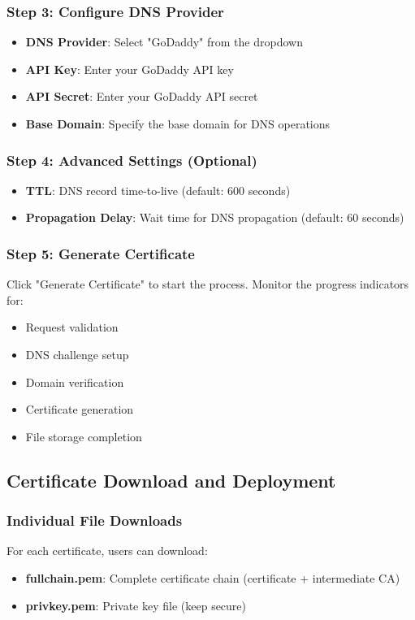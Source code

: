 \subsubsection{Step 3: Configure DNS Provider}
\begin{itemize}
    \item \textbf{DNS Provider}: Select "GoDaddy" from the dropdown
    \item \textbf{API Key}: Enter your GoDaddy API key
    \item \textbf{API Secret}: Enter your GoDaddy API secret
    \item \textbf{Base Domain}: Specify the base domain for DNS operations
\end{itemize}

\subsubsection{Step 4: Advanced Settings (Optional)}
\begin{itemize}
    \item \textbf{TTL}: DNS record time-to-live (default: 600 seconds)
    \item \textbf{Propagation Delay}: Wait time for DNS propagation (default: 60 seconds)
\end{itemize}

\subsubsection{Step 5: Generate Certificate}
Click "Generate Certificate" to start the process. Monitor the progress indicators for:
\begin{itemize}
    \item Request validation
    \item DNS challenge setup
    \item Domain verification
    \item Certificate generation
    \item File storage completion
\end{itemize}

\subsection{Certificate Download and Deployment}

\subsubsection{Individual File Downloads}
For each certificate, users can download:
\begin{itemize}
    \item \textbf{fullchain.pem}: Complete certificate chain (certificate + intermediate CA)
    \item \textbf{privkey.pem}: Private key file (keep secure)
\end{itemize}

